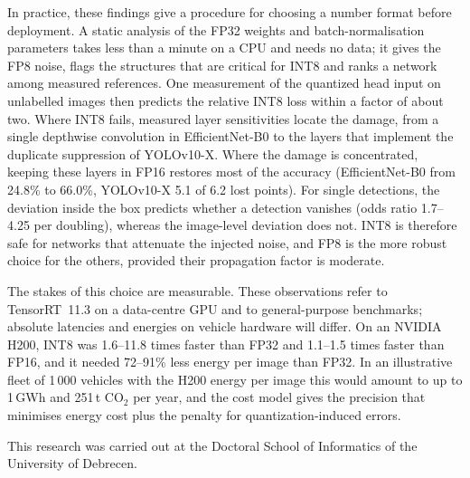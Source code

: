 \documentclass[pdflatex,sn-mathphys-num]{sn-jnl}%
\theoremstyle{thmstyleone}%
\theoremstyle{thmstyletwo}%
\theoremstyle{thmstylethree}%
\begin{document}
In practice, these findings give a procedure for choosing a number format before deployment. A static analysis of the FP32 weights and batch-normalisation parameters takes less than a minute on a CPU and needs no data; it gives the FP8 noise, flags the structures that are critical for INT8 and ranks a network among measured references. One measurement of the quantized head input on unlabelled images then predicts the relative INT8 loss within a factor of about two. Where INT8 fails, measured layer sensitivities locate the damage, from a single depthwise convolution in EfficientNet-B0 to the layers that implement the duplicate suppression of YOLOv10-X. Where the damage is concentrated, keeping these layers in FP16 restores most of the accuracy (EfficientNet-B0 from 24.8\% to 66.0\%, YOLOv10-X 5.1 of 6.2 lost points). For single detections, the deviation inside the box predicts whether a detection vanishes (odds ratio 1.7--4.25 per doubling), whereas the image-level deviation does not. INT8 is therefore safe for networks that attenuate the injected noise, and FP8 is the more robust choice for the others, provided their propagation factor is moderate.

The stakes of this choice are measurable. These observations refer to TensorRT~11.3 on a data-centre GPU and to general-purpose benchmarks; absolute latencies and energies on vehicle hardware will differ. On an NVIDIA H200, INT8 was 1.6--11.8 times faster than FP32 and 1.1--1.5 times faster than FP16, and it needed 72--91\% less energy per image than FP32. In an illustrative fleet of 1\,000 vehicles with the H200 energy per image this would amount to up to 1\,GWh and 251\,t CO$_2$ per year, and the cost model gives the precision that minimises energy cost plus the penalty for quantization-induced errors.
\backmatter

This research was carried out at the Doctoral School of Informatics of the University of Debrecen.
\end{document}
